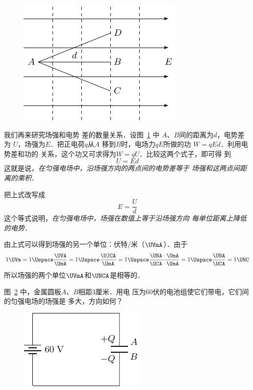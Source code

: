 \begin{figure}[htbp]
	\centering
	\includegraphics{fig/B/6-24.pdf}
	\caption{}\label{fig_B_6-24}
\end{figure}



我们再来研究场强和电势
差的数量关系．设图~\ref{fig_B_6-24} 中
$A$、$B$间的距离为$d$，电势差为
$U$，场强为$E$．把正电荷$q$从$A$
移到$B$时，电场力$qE$所做的功
$W=qEd$．利用电势差和功的
关系，这个功又可求得为$W=qU$．比较这两个式子，即可得
到
\[U=Ed\]
这就是说，\textit{在匀强电场中，沿场强方向的两点间的电势差等于
场强和这两点间距离的乘积}．

把上式改写成
\[E=\frac{U}{d} \]
这个等式说明，\textit{在匀强电场中，场强在数值上等于沿场强方向
每单位距离上降低的电势}．

由上式可以得到场强的另一个单位：伏特/米（$\UVmA$）．由于
\[1 \UVm = 1 \Uspace \frac{\UVA}{\UmA}=1\Uspace\frac{\UJCA}{\UmA}=1\Uspace\frac{\UNA\cdot \UmA}{\UCA\cdot \UmA}=1\Uspace\frac{\UNA}{\UCA} =1 \UNC  \]
所以场强的两个单位$\UVmA$和$\UNCA$是相等的．

\begin{example}
    图~\ref{fig_B_6-25} 中，金属圆板$A$、$B$相距3厘米．用电
压为60伏的电池组使它们带电，它们间的匀强电场的场强是
多大，方向如何？
\end{example}
\begin{figure}[htbp]
    \centering
    \includegraphics{fig/B/6-25.pdf}
    \caption{}\label{fig_B_6-25}
\end{figure}    

